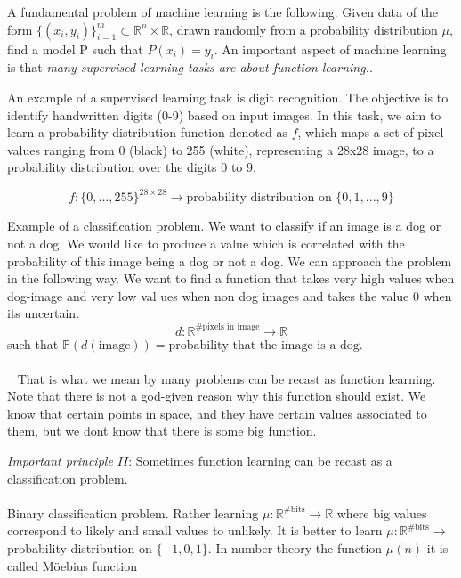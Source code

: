 \documentclass[../main.tex]{subfiles}
\begin{document}
	\noindent 
	A fundamental problem of machine learning is the following. Given data of the form $\{(x_i,y_i)\}^m_{i=1} \subset \mathbb{R}^n \times \mathbb{R}$, drawn randomly from a probability distribution $\mu$, find a model P such that $P(x_i)=y_i$. An important aspect of machine learning is that \textit{many supervised learning tasks are about function learning.}. 
	\begin{xmpl}
		\noindent An example of a supervised learning task is digit recognition. The objective is to identify handwritten digits (0-9) based on input images. In this task, we aim to learn a probability distribution function denoted as $f$, which maps a set of pixel values ranging from 0 (black) to 255 (white), representing a 28x28 image, to a probability distribution over the digits 0 to 9.
		
		$$f: \{0,..., 255\}^{28 \times 28} \longrightarrow \text{probability distribution on } \{0,1,...,9\}$$
		
	\end{xmpl}
	\begin{xmpl} Example of a classification problem. We want to classify if an image is a dog or not a dog. We would like to produce a value which is correlated with the probability of this image being a dog or not a dog.  We can approach the problem in the following way. We want to find a function that takes very high values when dog-image and very low val ues when non dog images and takes the value 0 when its uncertain. 
		$$d: \mathbb{R}^{\# \text{pixels in image}} \rightarrow \mathbb{R} $$
		such that $\mathbb{P}(d(\text{image})) = \text{probability that the image is a dog.}$ \\ \\  
		That is what we mean by many problems can be recast as function learning. Note that there is not a god-given reason why this function should exist. We know that certain points in space, and they have certain values associated to them, but we dont know that there is some big function. 
	\end{xmpl}
	
	\noindent \textit{Important principle $II$}: Sometimes function learning can be recast as a classification problem.  
	\\ \\ 
	Binary classification problem. 
	Rather learning $\mu : \mathbb{R}^{\# \text{bits}} \rightarrow \mathbb{R}$ where big values correspond to likely and small values to unlikely. It is better to learn $\mu : \mathbb{R}^{\# \text{bits}} \rightarrow $ probability distribution on $\{-1,0,1\}$. In number theory the function $\mu(n)$ it is called Möebius function 
	
\end{document}
